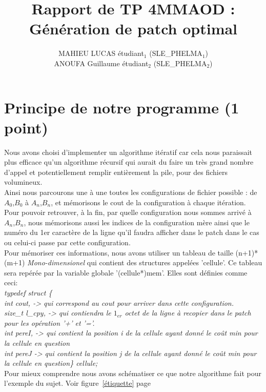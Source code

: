 \documentclass[a4paper, 10pt, french]{article}
\title{Rapport de TP 4MMAOD : Génération de patch optimal}
\author{
MAHIEU LUCAS étudiant$_1$ (SLE\_PHELMA$_1$) 
\\ ANOUFA Guillaume étudiant$_2$ (SLE\_PHELMA$_2$) 
}
\begin{document}
\maketitle


\section{Principe de notre  programme (1 point)}
{Nous avons choisi d'implementer un algorithme itératif car cela nous paraissait plus efficace qu'un algorithme récursif qui aurait du faire un très grand nombre d'appel et potentiellement remplir entièrement la pile, pour des fichiers volumineux.
\\ \indent Ainsi nous parcourons une à une toutes les configurations de fichier possible : de $A_0$,$B_0$ à $A_n$,$B_n$, et mémorisons le cout de la configuration à chaque itération.
\\ \indent Pour pouvoir retrouver, à la fin, par quelle configuration nous sommes arrivé à $A_n$,$B_n$, nous mémorisons aussi les indices de la configuration mère ainsi que le numéro du 1er caractère de la ligne qu'il faudra afficher dans le patch dans le cas ou celui-ci passe par cette configuration.
\\ \indent Pour mémoriser ces informations, nous avons utiliser un tableau de taille (n+1)*(m+1) {\em Mono-dimensionel} qui contient des structures appelées 'cellule'. Ce tableau sera repérée par la variable globale '(cellule*)mem'. Elles sont définies comme ceci:
{\em \\typedef struct  \{
\\ \indent int cout, -> qui correspond au cout pour arriver dans cette configuration.
\\ \indent size\_t l\_cpy, -> qui contiendra le $1_{er}$ octet de la ligne à recopier dans le patch pour les opération '+' et '='.
\\ \indent int pereI, -> qui contient la position i de la cellule ayant donné le coût min pour la cellule en question
\\ \indent int pereJ -> qui contient la position j de la cellule ayant donné le coût min pour la cellule en question\} cellule;}
\\ \indent Pour mieux comprendre nous avons schématiser ce que notre algorithme fait pour l'exemple du sujet. Voir figure~\ref{étiquette} page~\pageref{étiquette} 

}
\end{document}
